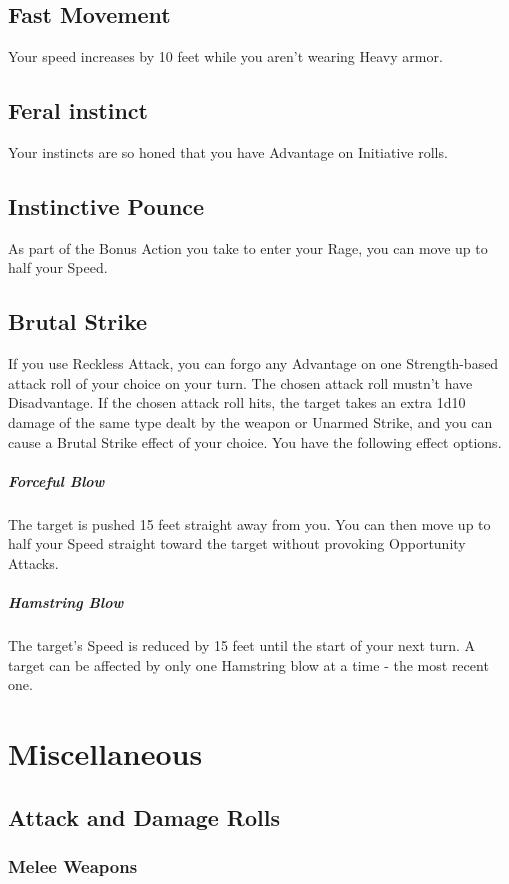 \documentclass[letterpaper,openany,oneside,twocolumn]{book}
\begin{document}
\subsection*{Fast Movement}
Your speed increases by 10 feet while you aren't wearing Heavy armor.
\subsection*{Feral instinct}
Your instincts are so honed that you have Advantage on Initiative rolls.
\subsection*{Instinctive Pounce}
As part of the Bonus Action you take to enter your Rage, you can move up to half your Speed.
\subsection*{Brutal Strike}
If you use Reckless Attack, you can forgo any Advantage on one Strength-based attack roll of your choice on your turn. The chosen attack roll mustn't have Disadvantage. If the chosen attack roll hits, the target takes an extra 1d10 damage of the same type dealt by the weapon or Unarmed Strike, and you can cause a Brutal Strike effect of your choice. You have the following effect options.
\subparagraph*{Forceful Blow} The target is pushed 15 feet straight away from you. You can then move up to half your Speed straight toward the target without provoking Opportunity Attacks.
\subparagraph*{Hamstring Blow} The target's Speed is reduced by 15 feet until the start of your next turn. A target can be affected by only one Hamstring blow at a time - the most recent one.
  
\vfill\eject
\section*{Miscellaneous}
\subsection*{Attack and Damage Rolls}
\subsubsection*{Melee Weapons}
\end{document}
